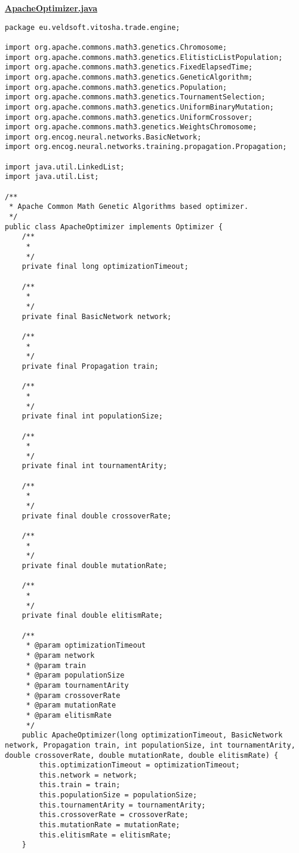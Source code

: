 \textbf{\underline{ApacheOptimizer.java}}
\begin{verbatim}
package eu.veldsoft.vitosha.trade.engine;

import org.apache.commons.math3.genetics.Chromosome;
import org.apache.commons.math3.genetics.ElitisticListPopulation;
import org.apache.commons.math3.genetics.FixedElapsedTime;
import org.apache.commons.math3.genetics.GeneticAlgorithm;
import org.apache.commons.math3.genetics.Population;
import org.apache.commons.math3.genetics.TournamentSelection;
import org.apache.commons.math3.genetics.UniformBinaryMutation;
import org.apache.commons.math3.genetics.UniformCrossover;
import org.apache.commons.math3.genetics.WeightsChromosome;
import org.encog.neural.networks.BasicNetwork;
import org.encog.neural.networks.training.propagation.Propagation;

import java.util.LinkedList;
import java.util.List;

/**
 * Apache Common Math Genetic Algorithms based optimizer.
 */
public class ApacheOptimizer implements Optimizer {
    /**
     *
     */
    private final long optimizationTimeout;

    /**
     *
     */
    private final BasicNetwork network;

    /**
     *
     */
    private final Propagation train;

    /**
     *
     */
    private final int populationSize;

    /**
     *
     */
    private final int tournamentArity;

    /**
     *
     */
    private final double crossoverRate;

    /**
     *
     */
    private final double mutationRate;

    /**
     *
     */
    private final double elitismRate;

    /**
     * @param optimizationTimeout
     * @param network
     * @param train
     * @param populationSize
     * @param tournamentArity
     * @param crossoverRate
     * @param mutationRate
     * @param elitismRate
     */
    public ApacheOptimizer(long optimizationTimeout, BasicNetwork network, Propagation train, int populationSize, int tournamentArity, double crossoverRate, double mutationRate, double elitismRate) {
        this.optimizationTimeout = optimizationTimeout;
        this.network = network;
        this.train = train;
        this.populationSize = populationSize;
        this.tournamentArity = tournamentArity;
        this.crossoverRate = crossoverRate;
        this.mutationRate = mutationRate;
        this.elitismRate = elitismRate;
    }


\end{verbatim}
